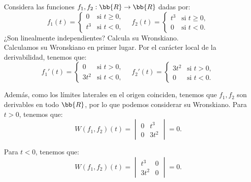 \documentclass[12pt]{article}
\begin{document}
    \begin{ejercicio}
        Considera las funciones $f_1,f_2:\bb{R}\to \bb{R}$ dadas por:
        \begin{equation*}
            f_1(t) = \begin{cases}
                0 & \text{si } t \geq 0,\\
                t^3 & \text{si } t < 0,
            \end{cases} \quad f_2(t) = \begin{cases}
                t^3 & \text{si } t \geq 0,\\
                0 & \text{si } t < 0.
            \end{cases}
        \end{equation*}
        ¿Son linealmente independientes? Calcula su Wronskiano.\\

        Calculamos su Wronskiano en primer lugar. Por el carácter local de la derivabilidad, tenemos que:
        \begin{equation*}
            f_1'(t) = \begin{cases}
                0 & \text{si } t > 0,\\
                3t^2 & \text{si } t < 0,
            \end{cases}\quad
            f_2'(t) = \begin{cases}
                3t^2 & \text{si } t > 0,\\
                0 & \text{si } t < 0.
            \end{cases}
        \end{equation*}

        Además, como los límites laterales en el origen coinciden, tenemos que $f_1,f_2$ son derivables en todo $\bb{R}$, por lo que podemos considerar su Wronskiano.
        Para $t>0$, tenemos que:
        \begin{equation*}
            W(f_1,f_2)(t) = \begin{vmatrix}
                0 & t^3\\
                0 & 3t^2
            \end{vmatrix} = 0.
        \end{equation*}

        Para $t<0$, tenemos que:
        \begin{equation*}
            W(f_1,f_2)(t) = \begin{vmatrix}
                t^3 & 0\\
                3t^2 & 0
            \end{vmatrix} = 0.
        \end{equation*}


\end{ejercicio}
\end{document}
